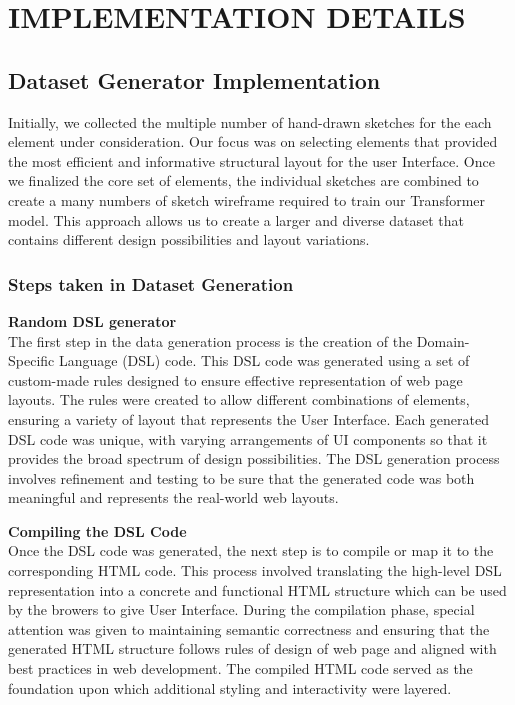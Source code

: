 \section{\MakeUppercase{Implementation Details}}
\subsection{Dataset Generator Implementation}
Initially, we collected the multiple number of hand-drawn sketches for the each element under consideration. Our focus was on selecting elements that provided the most efficient and informative structural layout for the user Interface. Once we finalized the core set of elements, the individual sketches are combined to create a many numbers of sketch wireframe required to train our Transformer model.  This approach allows us to create a larger and diverse dataset that contains different design possibilities and layout variations.
\subsubsection{Steps taken in Dataset Generation}
\textbf{Random DSL generator}\\
The first step in the data generation process is the creation of the Domain-Specific Language (DSL) code. This DSL code was generated using a set of custom-made rules designed to ensure effective representation of web page layouts. The rules were created to allow different combinations of elements, ensuring a variety of layout that represents the User Interface. Each generated DSL code was unique, with varying arrangements of UI components so that it provides the broad spectrum of design possibilities. The DSL generation process involves refinement and testing to be sure that the generated code was both meaningful and represents the real-world web layouts.

\textbf{Compiling the DSL Code}\\
Once the DSL code was generated, the next step is to compile or map it to the corresponding HTML code. This process involved translating the high-level DSL representation into a concrete and functional HTML structure which can be used by the browers to give User Interface. During the compilation phase, special attention was given to maintaining semantic correctness and ensuring that the generated HTML structure follows rules of design of web page and aligned with best practices in web development. The compiled HTML code served as the foundation upon which additional styling and interactivity were layered.

